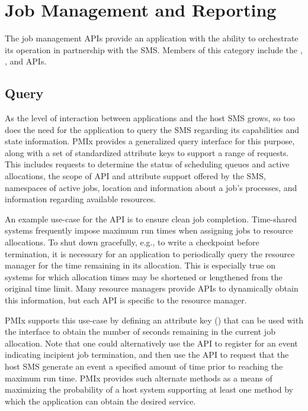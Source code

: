 \chapter{Job Management and Reporting}
\label{chap:api_job_mgmt}

The job management \acp{API} provide an application with the ability to orchestrate its operation in partnership with the \ac{SMS}.
Members of this category include the , , and  \acp{API}.

\section{Query}
\label{chap:api_proc_mgmt:query}

As the level of interaction between applications and the host \ac{SMS} grows, so too does the need for the application to query the \ac{SMS} regarding its capabilities and state information. \ac{PMIx} provides a generalized query interface for this purpose, along with a set of standardized attribute keys to support a range of requests. This includes requests to determine the status of scheduling queues and active allocations, the scope of \ac{API} and attribute support offered by the \ac{SMS}, namespaces of active jobs, location and information about a job's processes, and information regarding available resources.

An example use-case for the  \ac{API} is to ensure clean job completion. Time-shared systems frequently impose maximum run times when assigning jobs to resource allocations. To shut down gracefully, e.g., to write a checkpoint before termination, it is necessary for an application to periodically query the resource manager for the time remaining in its allocation. This is especially true on systems for which allocation times may be shortened or lengthened from the original time limit. Many resource managers provide \acp{API} to dynamically obtain this information, but each \ac{API} is specific to the resource manager.

\ac{PMIx} supports this use-case by defining an attribute key () that can be used with the  interface to obtain the number of seconds remaining in the current job allocation. Note that one could alternatively use the  \ac{API} to register for an event indicating incipient job termination, and then use the  \ac{API} to request that the host \ac{SMS} generate an event a specified amount of time prior to reaching the maximum run time. \ac{PMIx} provides such alternate methods as a means of maximizing the probability of a host system supporting at least one method by which the application can obtain the desired service.

